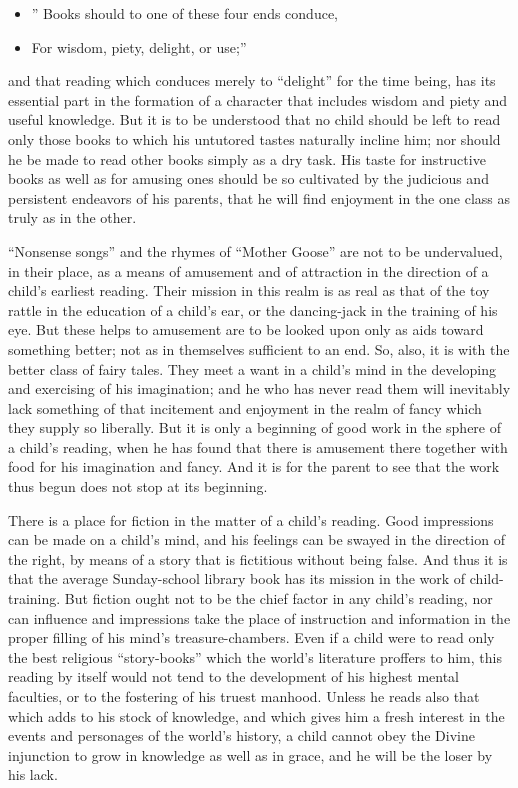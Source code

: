 \documentclass[
]{book}
\providecommand{\tightlist}{%
  \setlength{\itemsep}{0pt}\setlength{\parskip}{0pt}}
\begin{document}
\begin{itemize}
\tightlist
\item
  '' Books should to one of these four ends conduce,
\item
  For wisdom, piety, delight, or use;''
\end{itemize}

and that reading which conduces merely to ``delight'' for the time being, has its essential part in the formation of a character that includes wisdom and piety and useful knowledge. But it is to be understood that no child should be left to read only those books to which his untutored tastes naturally incline him; nor should he be made to read other books simply as a dry task. His taste for instructive books as well as for amusing ones should be so cultivated by the judicious and persistent endeavors of his parents, that he will find enjoyment in the one class as truly as in the other.

``Nonsense songs'' and the rhymes of ``Mother Goose'' are not to be undervalued, in their place, as a means of amusement and of attraction in the direction of a child's earliest reading. Their mission in this realm is as real as that of the toy rattle in the education of a child's ear, or the dancing-jack in the training of his eye. But these helps to amusement are to be looked upon only as aids toward something better; not as in themselves sufficient to an end. So, also, it is with the better class of fairy tales. They meet a want in a child's mind in the developing and exercising of his imagination; and he who has never read them will inevitably lack something of that incitement and enjoyment in the realm of fancy which they supply so liberally. But it is only a beginning of good work in the sphere of a child's reading, when he has found that there is amusement there together with food for his imagination and fancy. And it is for the parent to see that the work thus begun does not stop at its beginning.

There is a place for fiction in the matter of a child's reading. Good impressions can be made on a child's mind, and his feelings can be swayed in the direction of the right, by means of a story that is fictitious without being false. And thus it is that the average Sunday-school library book has its mission in the work of child-training. But fiction ought not to be the chief factor in any child's reading, nor can influence and impressions take the place of instruction and information in the proper filling of his mind's treasure-chambers. Even if a child were to read only the best religious ``story-books'' which the world's literature proffers to him, this reading by itself would not tend to the development of his highest mental faculties, or to the fostering of his truest manhood. Unless he reads also that which adds to his stock of knowledge, and which gives him a fresh interest in the events and personages of the world's history, a child cannot obey the Divine injunction to grow in knowledge as well as in grace, and he will be the loser by his lack.
\end{document}
